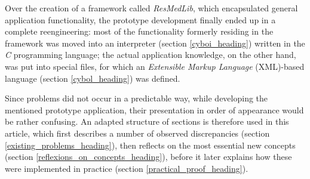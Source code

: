 Over the creation of a framework called \emph{ResMedLib}, which encapsulated
general application functionality, the prototype development finally ended up
in a complete reengineering: most of the functionality formerly residing in the
framework was moved into an interpreter (section \ref{cyboi_heading}) written
in the \emph{C} programming language; the actual application knowledge, on the
other hand, was put into special files, for which an
\emph{Extensible Markup Language} (XML)-based language (section
\ref{cybol_heading}) was defined.

Since problems did not occur in a predictable way, while developing the
mentioned prototype application, their presentation in order of appearance
would be rather confusing. An adapted structure of sections is therefore used
in this article, which first describes a number of observed discrepancies
(section \ref{existing_problems_heading}), then reflects on the most essential
new concepts (section \ref{reflexions_on_concepts_heading}), before it later
explains how these were implemented in practice (section
\ref{practical_proof_heading}).
